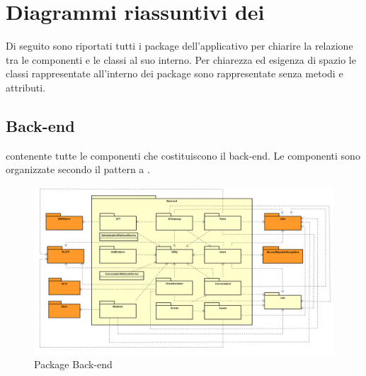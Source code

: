 \section{Diagrammi riassuntivi dei }
Di seguito sono riportati tutti i package dell’applicativo per chiarire la relazione tra le componenti e le classi al suo interno. Per chiarezza ed esigenza di spazio le classi rappresentate all’interno dei package sono rappresentate senza metodi e attributi.


\subsection{Back-end}
 contenente tutte le componenti che costituiscono il back-end. Le componenti sono organizzate secondo il pattern a .
\begin{figure}[h] \centering \includegraphics[width=\textwidth,height=\textheight,keepaspectratio]{images/diagrams/back-end/Official_Backend_0304/Back-end.png}
	\caption{Package Back-end}
\end{figure}
\newpage

